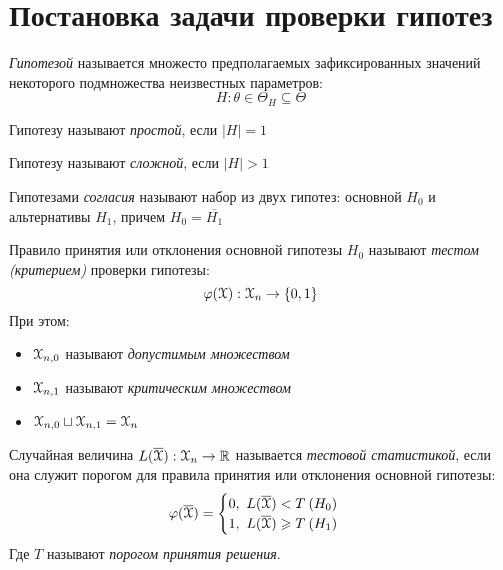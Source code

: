 \section{Постановка задачи проверки гипотез}

\begin{definition}
	\textit{Гипотезой} называется множесто предполагаемых зафиксированных значений
	некоторого подмножества неизвестных параметров:
	\[
		H: \theta \in \Theta_{H} \subseteq \Theta
	\]
\end{definition}

\begin{definition}
	Гипотезу называют \textit{простой}, если $|H| = 1$
\end{definition}

\begin{definition}
	Гипотезу называют \textit{сложной}, если $|H| > 1$
\end{definition}

\begin{definition}
	Гипотезами \textit{согласия} называют набор из двух гипотез: основной $H_0$ и
	альтернативы $H_1$, причем $H_0 = \overline{H_1}$
\end{definition}

\begin{definition}
	Правило принятия или отклонения основной гипотезы $H_0$ называют
	\textit{тестом (критерием)} проверки гипотезы:
	\[
		\varphi(\mathcal{X}): \mathcal{X}_{n} \to \{0, 1\}
	\]
	При этом:
	\begin{itemize}
		\item $\mathcal{X}_{n, 0}$ называют \textit{допустимым множеством}
		\item $\mathcal{X}_{n, 1}$ называют \textit{критическим множеством}
		\item $\mathcal{X}_{n, 0} \sqcup \mathcal{X}_{n, 1} = \mathcal{X}_{n}$
	\end{itemize}
\end{definition}

\begin{definition}
	Случайная величина $L(\overline{\mathcal{X}}): \mathcal{X}_n \to \mathbb{R}$ называется
	\textit{тестовой статистикой}, если она служит порогом для правила принятия
	или отклонения основной гипотезы:
	\[
		\varphi(\overline{\mathcal{X}}) = \begin{cases}
			0,~ L(\overline{\mathcal{X}}) < T \> (H_0) \\
			1,~ L(\overline{\mathcal{X}}) \geqslant T \> (H_1)
		\end{cases}
	\]
	Где $T$ называют \textit{порогом принятия решения}.
\end{definition}
